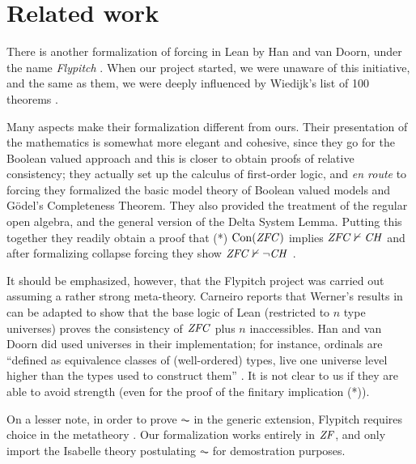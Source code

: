 \section{Related work}
\label{sec:related-work}

There is another formalization of forcing in Lean by Han and van
Doorn, under the name \emph{Flypitch} \cite{han_et_al:LIPIcs:2019:11074,DBLP:conf/cpp/HanD20}. When our project started, we
were unaware of this initiative, and the same as them, we were deeply
influenced by Wiedijk's list of 100 theorems \cite{Formalizing100}.

Many aspects make their formalization different from ours. Their
presentation of the mathematics is somewhat more elegant and cohesive,
since they go for the Boolean valued approach and this is closer to
obtain proofs of relative consistency; they actually set up the
calculus of first-order logic, and \emph{en route} to forcing they
formalized the basic model theory of Boolean valued models and Gödel's
Completeness Theorem. They also provided the treatment of the regular
open algebra, and the general version of the Delta System
Lemma. Putting this together they readily obtain a proof that
(*) $\operatorname{Con}(\mathit{ZFC})$ implies 
$\mathit{ZFC}\nvdash \mathit{CH}$ \cite{han_et_al:LIPIcs:2019:11074} and after
formalizing collapse forcing they show  $\mathit{ZFC}\nvdash \neg\mathit{CH}$
\cite{DBLP:conf/cpp/HanD20}.

It should be emphasized, however, that the Flypitch project was
carried out assuming a rather strong meta-theory. 
Carneiro \cite{carneiro-ms-thesis} reports that Werner's results in
\cite{10.5555/645869.668660} can be adapted to show that the base
logic  of Lean (restricted to $n$
type universes) proves the consistency of $\mathit{ZFC}$ plus $n$
inaccessibles. Han and van Doorn did used universes in their
implementation; for instance, ordinals are “defined as equivalence
classes of (well-ordered) types, live one
universe level higher than the types used to construct them”
\cite{han_et_al:LIPIcs:2019:11074}. It is not clear to us if they are
able to avoid strength (even for the proof of the finitary implication
(*)).

On a lesser note, in order to prove $\AC$ in the generic extension,
Flypitch requires choice in the metatheory
\cite[p.~11]{han_et_al:LIPIcs:2019:11074}. Our formalization works
entirely in $\mathit{ZF}$, and only import the Isabelle theory postulating
$\AC$ for demostration purposes.

